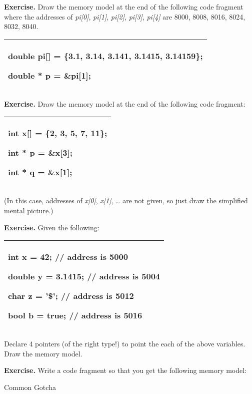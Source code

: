 \documentclass[
]{article}
\begin{document}
\textbf{Exercise.} Draw the memory model at the end of the following
code fragment where the addresses of \emph{pi{[}0{]}}, \emph{pi{[}1{]}},
\emph{pi{[}2{]}}, \emph{pi{[}3{]}}, \emph{pi{[}4{]}} are 8000, 8008,
8016, 8024, 8032, 8040.

\begin{longtable}[]{@{}l@{}}
\toprule
\endhead
\begin{minipage}[t]{0.97\columnwidth}\raggedright
double pi{[}{]} = \{3.1, 3.14, 3.141, 3.1415, 3.14159\};

double * p = \&pi{[}1{]};\strut
\end{minipage}\tabularnewline
\bottomrule
\end{longtable}

\textbf{Exercise.} Draw the memory model at the end of the following
code fragment:

\begin{longtable}[]{@{}l@{}}
\toprule
\endhead
\begin{minipage}[t]{0.97\columnwidth}\raggedright
int x{[}{]} = \{2, 3, 5, 7, 11\};

int * p = \&x{[}3{]};

int * q = \&x{[}1{]};\strut
\end{minipage}\tabularnewline
\bottomrule
\end{longtable}

(In this case, addresses of \emph{x{[}0{]}}, \emph{x{[}1{]}}, \ldots{}
are not given, so just draw the simplified mental picture.)

\textbf{Exercise.} Given the following:

\begin{longtable}[]{@{}l@{}}
\toprule
\endhead
\begin{minipage}[t]{0.97\columnwidth}\raggedright
int x = 42; // address is 5000

double y = 3.1415; // address is 5004

char z = '\$'; // address is 5012

bool b = true; // address is 5016\strut
\end{minipage}\tabularnewline
\bottomrule
\end{longtable}

Declare 4 pointers (of the right type!) to point the each of the above
variables. Draw the memory model.

\textbf{Exercise.} Write a code fragment so that you get the following
memory model:

Common Gotcha
\end{document}
